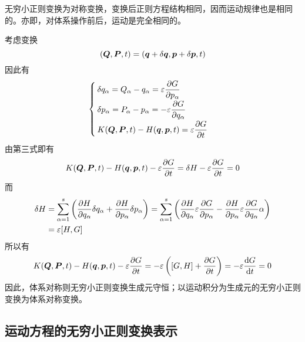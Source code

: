 无穷小正则变换为对称变换，变换后正则方程结构相同，因而运动规律也是相同的。亦即，对体系操作前后，运动是完全相同的。

考虑变换
\begin{equation*}
	(\boldsymbol{Q},\boldsymbol{P},t) = (\boldsymbol{q}+\delta \boldsymbol{q},\boldsymbol{p}+\delta \boldsymbol{p},t)
\end{equation*}
因此有
\begin{equation*}
	\begin{cases}
		\delta q_\alpha = Q_\alpha-q_\alpha = \varepsilon \dfrac{\partial G}{\partial p_\alpha} \\[1.5ex]
		\delta p_\alpha = P_\alpha-p_\alpha = -\varepsilon \dfrac{\partial G}{\partial q_\alpha} \\[1.5ex]
		K(\boldsymbol{Q},\boldsymbol{P},t) - H(\boldsymbol{q},\boldsymbol{p},t) = \varepsilon \dfrac{\partial G}{\partial t}
	\end{cases}
\end{equation*}
由第三式即有
\begin{equation*}
	K(\boldsymbol{Q},\boldsymbol{P},t) - H(\boldsymbol{q},\boldsymbol{p},t) - \varepsilon \frac{\partial G}{\partial t} = \delta H - \varepsilon \frac{\partial G}{\partial t} = 0
\end{equation*}
而
\begin{align*}
	\delta H & = \sum_{\alpha=1}^s \left(\frac{\partial H}{\partial q_\alpha} \delta q_\alpha + \frac{\partial H}{\partial p_\alpha} \delta p_\alpha\right) = \sum_{\alpha=1}^s \left(\frac{\partial H}{\partial q_\alpha} \varepsilon \frac{\partial G}{\partial p_\alpha} - \frac{\partial H}{\partial p_\alpha} \varepsilon \frac{\partial G}{\partial q_\alpha}\alpha\right) \\
	& = \varepsilon [H,G]
\end{align*}
所以有
\begin{equation*}
	K(\boldsymbol{Q},\boldsymbol{P},t) - H(\boldsymbol{q},\boldsymbol{p},t) - \varepsilon \frac{\partial G}{\partial t} = -\varepsilon \left([G,H] + \frac{\partial G}{\partial t}\right) = -\varepsilon \frac{\mathrm{d} G}{\mathrm{d} t} = 0
\end{equation*}
因此，体系对称则无穷小正则变换生成元守恒；以运动积分为生成元的无穷小正则变换为体系对称变换。


\subsection{运动方程的无穷小正则变换表示}

